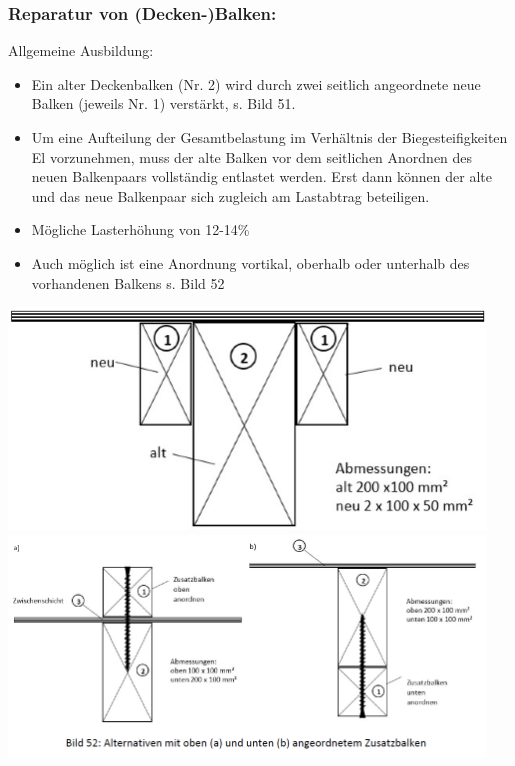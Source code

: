 \documentclass[fleqn,twoside]{article}
\begin{document}
    \subsubsection{Reparatur von (Decken-)Balken:}
        
    \begin{minipage}{0.55\textwidth}
    Allgemeine Ausbildung:
        \begin{itemize}
            \item Ein alter Deckenbalken (Nr. 2) wird durch zwei seitlich angeordnete neue Balken (jeweils Nr. 1) verstärkt, s. Bild 51. 
            \item Um eine Aufteilung der Gesamtbelastung im Verhältnis der Biegesteifigkeiten El vorzunehmen, muss der alte Balken vor dem seitlichen Anordnen des neuen Balkenpaars vollständig entlastet werden. Erst dann können der alte und das neue Balkenpaar sich zugleich am Lastabtrag beteiligen.
            \item Mögliche Lasterhöhung von 12-14\%
            \item Auch möglich ist eine Anordnung vortikal, oberhalb oder unterhalb des vorhandenen Balkens s. Bild 52
        \end{itemize}

        \end{minipage}
        \begin{minipage}{0.45\textwidth}
        \includegraphics[width=0.95\textwidth]{Grafiken/Denkmalpflegerische Arbeit/Reparatur von Deckenbalken.png}\\
        \includegraphics[width=0.95\textwidth]{Grafiken/Denkmalpflegerische Arbeit/Reparatur von Deckenbalken vertikal.png}
        \end{minipage}
        
\end{document}
